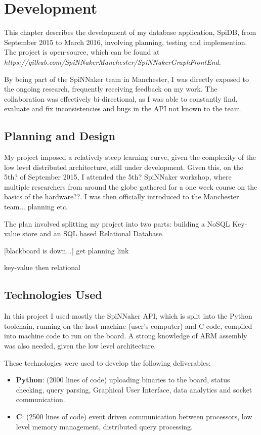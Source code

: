 \chapter{Development}

This chapter describes the development of my database application, SpiDB, from September 2015 to March 2016, involving planning, testing and implemention. The project is open-source, which can be found at
\textit{https://github.com/SpiNNakerManchester/SpiNNakerGraphFrontEnd}.

By being part of the SpiNNaker team in Manchester, I was directly exposed to the ongoing research, frequently receiving feedback on my work. The collaboration was effectively bi-directional, as I was able to constantly find, evaluate and fix inconsistencies and bugs in the API not known to the team.

\section{Planning and Design}
My project imposed a relatively steep learning curve, given the complexity of the low level distributed architecture, still under development. Given this, on the 5th? of September 2015, I attended the 5th? SpiNNaker workshop, where multiple researchers from around the globe gathered for a one week course on the basics of the hardware??. I was then officially introduced to the Manchester team... planning etc.

The plan involved splitting my project into two parts: building a NoSQL Key-value store and an SQL based Relational Database.

[blackboard is down...] get planning link

key-value then relational

\section{Technologies Used}
In this project I used mostly the SpiNNaker API, which is split into the Python toolchain, running on the host machine (user's computer) and C code, compiled into machine code to run on the board. A strong knowledge of ARM assembly was also needed, given the low level architecture.
 
These technologies were used to develop the following deliverables:
\begin{itemize}
	\item \textbf{Python}: (2000 lines of code) uploading binaries to the board, status checking, query parsing, Graphical User Interface, data analytics and socket communication.
	\item \textbf{C}: (2500 lines of code) event driven communication between processors, low level memory management, distributed query processing.
\end{itemize}

